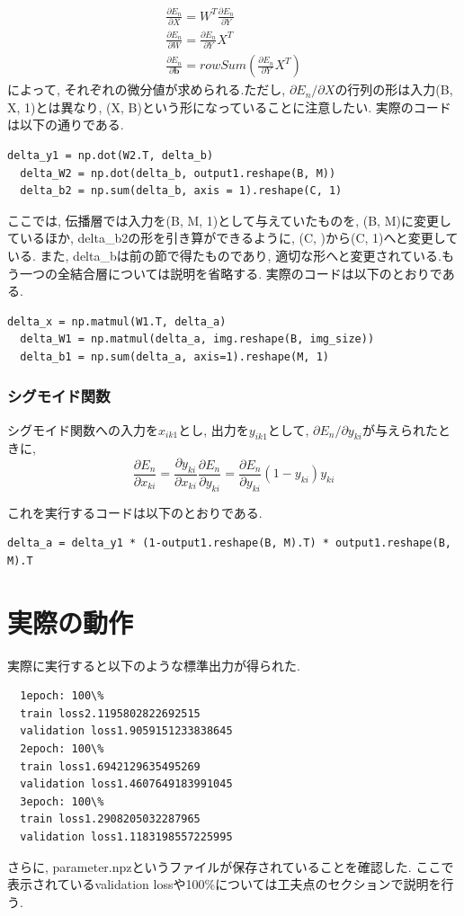 \documentclass[a4paper,11pt]{jsarticle}
\begin{document}
\begin{gather}
  \frac{\partial E_n}{\partial X} = W^T \frac{\partial E_n}{\partial Y} \\
  \frac{\partial E_n}{\partial W} = \frac{\partial E_n}{\partial Y} X^T \\
  \frac{\partial E_n}{\partial \bm{b}} = rowSum (\frac{\partial E_n}{\partial Y} X^T)
\end{gather}
によって, それぞれの微分値が求められる.ただし,
$\partial E_n / \partial X$の行列の形は入力(B, X, 1)とは異なり,
(X, B)という形になっていることに注意したい.
実際のコードは以下の通りである.
\begin{lstlisting}[caption = 全結合層2]
  delta_y1 = np.dot(W2.T, delta_b)
  delta_W2 = np.dot(delta_b, output1.reshape(B, M))
  delta_b2 = np.sum(delta_b, axis = 1).reshape(C, 1)
\end{lstlisting}
\par
ここでは, 伝播層では入力を(B, M, 1)として与えていたものを,
(B, M)に変更しているほか, delta\_b2の形を引き算ができるように,
(C, )から(C, 1)へと変更している. また, delta\_bは前の節で得たものであり,
適切な形へと変更されている.もう一つの全結合層については説明を省略する.
実際のコードは以下のとおりである.
\begin{lstlisting}[caption = 全結合層1]
  delta_x = np.matmul(W1.T, delta_a)
  delta_W1 = np.matmul(delta_a, img.reshape(B, img_size))
  delta_b1 = np.sum(delta_a, axis=1).reshape(M, 1)
\end{lstlisting}

\subsubsection*{シグモイド関数}
シグモイド関数への入力を$x_{ik1}$とし, 出力を$y_{ik1}$として,
$ \partial E_n / \partial y_{ki}$が与えられたときに,
$$ \frac{\partial E_n}{\partial x_{ki}} =
  \frac{\partial y_{ki}}{\partial x_{ki}} \frac{\partial E_n}{\partial y_{ki}}=
  \frac{\partial E_n}{\partial y_{ki}} (1 - y_{ki}) y_{ki}
$$

これを実行するコードは以下のとおりである.
\begin{lstlisting}[caption=シグモイド関数]
  delta_a = delta_y1 * (1-output1.reshape(B, M).T) * output1.reshape(B, M).T
\end{lstlisting}

\section{実際の動作}
実際に実行すると以下のような標準出力が得られた.
\begin{lstlisting}
  1epoch: 100\%
  train loss2.1195802822692515
  validation loss1.9059151233838645
  2epoch: 100\%
  train loss1.6942129635495269
  validation loss1.4607649183991045
  3epoch: 100\%
  train loss1.2908205032287965
  validation loss1.1183198557225995
\end{lstlisting}
さらに, parameter.npzというファイルが保存されていることを確認した.
ここで表示されているvalidation lossや100\%については工夫点のセクションで説明を行う.
\end{document}
